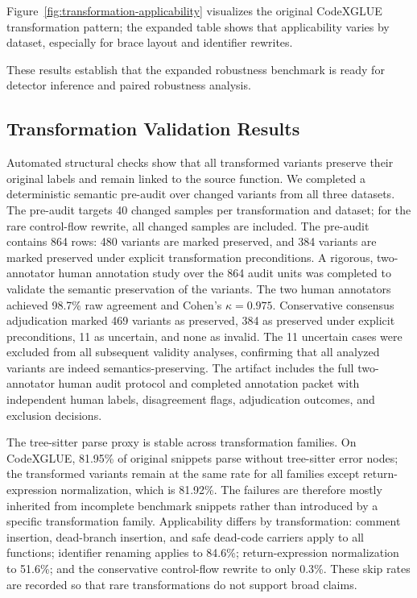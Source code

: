 \documentclass[a4paper,fleqn]{cas-dc}
\begin{document}
Figure~\ref{fig:transformation-applicability} visualizes the original
CodeXGLUE transformation pattern; the expanded table shows that applicability varies by
dataset, especially for brace layout and identifier rewrites.

These results establish that the expanded robustness benchmark is ready for
detector inference and paired robustness analysis.

\subsection{Transformation Validation Results}

Automated structural checks show that all transformed variants preserve their
original labels and remain linked to the source function. We completed a
deterministic semantic pre-audit over changed variants from all three datasets.
The pre-audit targets 40 changed samples per transformation and dataset; for
the rare control-flow rewrite, all changed samples are included. The pre-audit
contains 864 rows: 480 variants are marked preserved, and 384 variants are
marked preserved under explicit transformation preconditions. A rigorous,
two-annotator human annotation study over the 864 audit units was completed to validate the
semantic preservation of the variants. The two human annotators achieved 98.7\%
raw agreement and Cohen's $\kappa=0.975$. Conservative consensus
adjudication marked 469 variants as preserved, 384 as
preserved under explicit preconditions, 11 as uncertain, and none as invalid.
The 11 uncertain cases were excluded from all subsequent validity analyses,
confirming that all analyzed variants are indeed semantics-preserving. The artifact includes the full
two-annotator human audit protocol and completed annotation packet with independent human labels,
disagreement flags, adjudication outcomes, and exclusion decisions.

The tree-sitter parse proxy is stable across transformation families. On
CodeXGLUE, 81.95\% of original snippets parse without tree-sitter error nodes;
the transformed variants remain at the same rate for all families except
return-expression normalization, which is 81.92\%. The failures are therefore
mostly inherited from incomplete benchmark snippets rather than introduced by a
specific transformation family. Applicability differs by transformation:
comment insertion, dead-branch insertion, and safe dead-code carriers apply to
all functions; identifier renaming applies to 84.6\%; return-expression
normalization to 51.6\%; and the conservative control-flow rewrite to only
0.3\%. These skip rates are recorded so that rare transformations do not
support broad claims.
\end{document}
